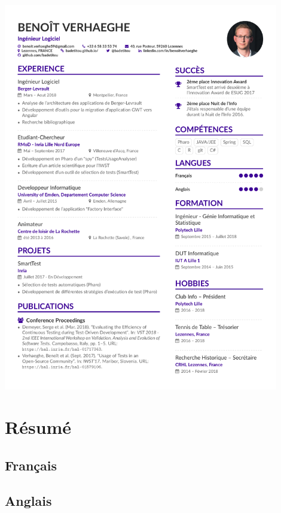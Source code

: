 \documentclass[11pt,]{article}
\begin{document}
\includegraphics[width=0.9\textwidth,height=\textheight]{cv/cv.pdf}
\newpage

\hypertarget{ruxe9sumuxe9}{%
\section*{Résumé}\label{ruxe9sumuxe9}}

\hypertarget{franuxe7ais}{%
\subsection*{Français}\label{franuxe7ais}}

\hypertarget{anglais}{%
\subsection*{Anglais}\label{anglais}}
\end{document}
